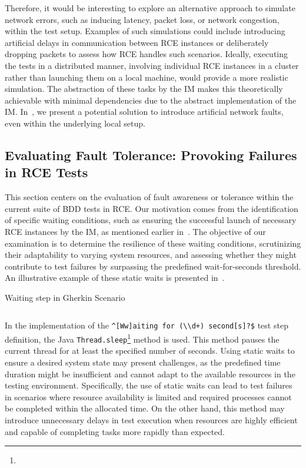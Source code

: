 Therefore, it would be interesting to explore an alternative approach to simulate network errors, such as inducing latency, packet loss, or network congestion, within the test setup. Examples of such simulations could include introducing artificial delays in communication between \ac{RCE} instances or deliberately dropping packets to assess how \ac{RCE} handles such scenarios. Ideally, executing the tests in a distributed manner, involving individual \ac{RCE} instances in a cluster rather than launching them on a local machine, would provide a more realistic simulation. The abstraction of these tasks by the \ac{IM} makes this theoretically achievable with minimal dependencies due to the abstract implementation of the \ac{IM}. In~, we present a potential solution to introduce artificial network faults, even within the underlying local setup.

\subsection{Evaluating Fault Tolerance: Provoking Failures in \ac{RCE} Tests}
\label{subsec:fault-tolerance}
This section centers on the evaluation of fault awareness or tolerance within the current suite of \ac{BDD} tests in \ac{RCE}. Our motivation comes from the identification of specific waiting conditions, such as ensuring the successful launch of necessary RCE instances by the \ac{IM}, as mentioned earlier in~. The objective of our examination is to determine the resilience of these waiting conditions, scrutinizing their adaptability to varying system resources, and assessing whether they might contribute to test failures by surpassing the predefined wait-for-seconds threshold. An illustrative example of these static waits is presented in~.

\begin{listing}[!ht]
\caption{Waiting step in Gherkin Scenario}
\label{lst:staticwait}
\inputminted{gherkin}{files/code/staticwait.feature}
\end{listing}

In the implementation of the \verb|^[Ww]aiting for (\\d+) second[s]?$| test step definition, the Java \texttt{Thread.sleep}\footnote{} method is used. This method pauses the current thread for at least the specified number of seconds. Using static waits to ensure a desired system state may present challenges, as the predefined time duration might be insufficient and cannot adapt to the available resources in the testing environment. Specifically, the use of static waits can lead to test failures in scenarios where resource availability is limited and required processes cannot be completed within the allocated time. On the other hand, this method may introduce unnecessary delays in test execution when resources are highly efficient and capable of completing tasks more rapidly than expected.

